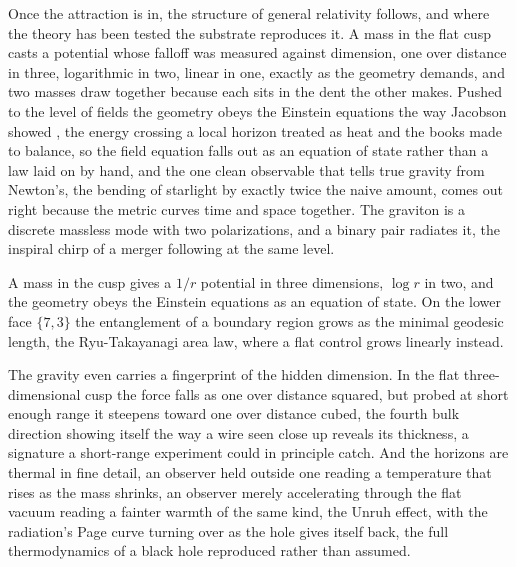 Once the attraction is in, the structure of general relativity follows, and where the theory has been tested the substrate reproduces it. A mass in the flat cusp casts a potential whose falloff was measured against dimension, one over distance in three, logarithmic in two, linear in one, exactly as the geometry demands, and two masses draw together because each sits in the dent the other makes. Pushed to the level of fields the geometry obeys the Einstein equations the way Jacobson showed \cite{jacobson1995}, the energy crossing a local horizon treated as heat and the books made to balance, so the field equation falls out as an equation of state rather than a law laid on by hand, and the one clean observable that tells true gravity from Newton's, the bending of starlight by exactly twice the naive amount, comes out right because the metric curves time and space together. The graviton is a discrete massless mode with two polarizations, and a binary pair radiates it, the inspiral chirp of a merger following at the same level.

\begin{result}
A mass in the cusp gives a $1/r$ potential in three dimensions, $\log r$ in two, and the geometry obeys the Einstein equations as an equation of state. On the lower face $\{7,3\}$ the entanglement of a boundary region grows as the minimal geodesic length, the Ryu-Takayanagi area law, where a flat control grows linearly instead. \cite{pollard2026vibetest}
\end{result}

The gravity even carries a fingerprint of the hidden dimension. In the flat three-dimensional cusp the force falls as one over distance squared, but probed at short enough range it steepens toward one over distance cubed, the fourth bulk direction showing itself the way a wire seen close up reveals its thickness, a signature a short-range experiment could in principle catch. And the horizons are thermal in fine detail, an observer held outside one reading a temperature that rises as the mass shrinks, an observer merely accelerating through the flat vacuum reading a fainter warmth of the same kind, the Unruh effect, with the radiation's Page curve turning over as the hole gives itself back, the full thermodynamics of a black hole reproduced rather than assumed.

